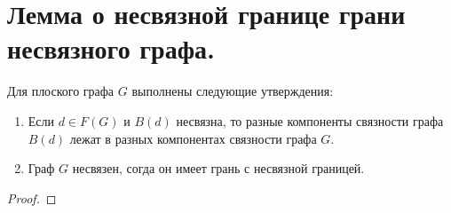 \section{Лемма о несвязной границе грани несвязного графа.}
\begin{lemma}\label{lm:planar_3}
	Для плоского графа $G$ выполнены следующие утверждения:
    \begin{enumerate}
		\item Если  $d \in F(G) $ и $B(d)$ несвязна, то разные компоненты связности графа $B(d) $ лежат в разных компонентах связности графа $G$.
		\item Граф $G$ несвязен, согда он имеет грань с несвязной границей.
    \end{enumerate}
\end{lemma}
\begin{proof}
    
\end{proof}
